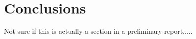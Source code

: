 \chapter{Conclusions}\label{C:con}
Not sure if this is actually a section in a preliminary report.....
